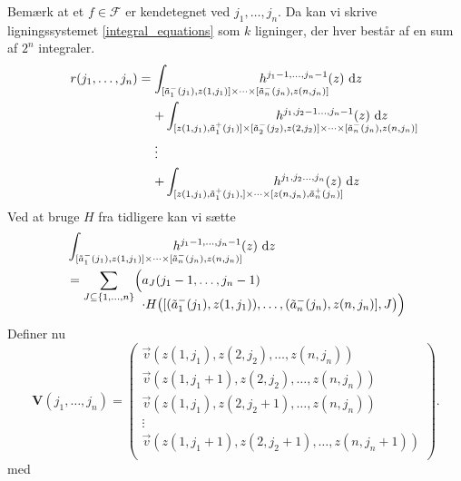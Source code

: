 \documentclass[a4paper, 12pt]{memoir}
\begin{document}
Bemærk at et $f\in\mathcal F$ er kendetegnet ved $j_1,\dots, j_n$. Da kan vi skrive ligningssystemet \eqref{integral_equations} som $k$ ligninger, der hver består af en sum af $2^n$ integraler.
\begin{align}
r(j_1,\dots, j_n)&=\begin{lgathered}[t]\int_{[\tilde a_1^-(j_1), z(1,j_1)]\times \cdots \times [\tilde a_n^-(j_n),  z(n,j_n)]} \hspace{-2cm} h^{j_1-1, \dots, j_n-1}(z) \textup{ d}z\\
+\int_{[z(1,j_1), \tilde a_1^+(j_1)]\times [\tilde a_2^-(j_2), z(2,j_2)]\times \cdots \times [\tilde a_n^-(j_n),  z(n,j_n)]} \hspace{-4cm}h^{j_1,j_2-1 \dots, j_n-1}(z) \textup{ d}z\\
\vdots\\
+\int_{[z(1,j_1), \tilde a_1^+(j_1), ]\times \cdots \times [z(n,j_n), \tilde a_n^+(j_n)]} 
\hspace{-2cm}h^{j_1,j_2 \dots, j_n}(z) \textup{ d}z
\end{lgathered}\label{integral_equations_by_js}
\end{align}
Ved at bruge $H$ fra tidligere kan vi sætte
\begin{align}
&\int_{[\tilde a_1^-(j_1), z(1,j_1)]\times \cdots \times [\tilde a_n^-(j_n),  z(n,j_n)]} \hspace{-2cm} h^{j_1-1, \dots, j_n-1}(z) \textup{ d}z\nonumber\\
&=\sum_{J\subseteq\{1, \dots, n\}}\Bigl( \begin{lgathered}[t]a_J(j_1-1, \dots, j_n-1)\\
\cdot H\bigl([(\tilde a_1^-(j_1), z(1,j_1)), \dots, (\tilde a_n^-(j_n), z(n,j_n)], J\bigr)\Bigr)\end{lgathered}\label{integral_computation_before_matrices}
\end{align}
Definer nu
\begin{equation}
\mathbf{V}(j_1, \dots, j_n)=\begin{pmatrix}
\vec{v}(z(1,j_1),z(2,j_2), \dots, z(n,j_n))\\
\vec{v}(z(1,j_1+1),z(2,j_2), \dots, z(n,j_n))\\
\vec{v}(z(1,j_1),z(2,j_2+1), \dots, z(n,j_n))\\
\vdots\\
\vec{v}(z(1,j_1+1),z(2,j_2+1), \dots, z(n,j_n+1))\\
\end{pmatrix}.
\end{equation}
med 
\end{document}
